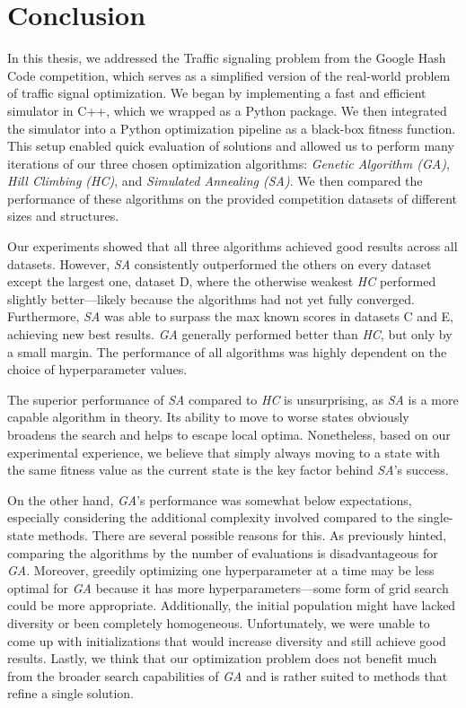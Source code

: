 \chapter*{Conclusion}

In this thesis, we addressed the Traffic signaling problem from the Google Hash Code competition, which serves as a simplified version of the real-world problem of traffic signal optimization. We began by implementing a fast and efficient simulator in C++, which we wrapped as a Python package. We then integrated the simulator into a Python optimization pipeline as a black-box fitness function. This setup enabled quick evaluation of solutions and allowed us to perform many iterations of our three chosen optimization algorithms: \textit{Genetic Algorithm (GA)}, \textit{Hill Climbing (HC)}, and \textit{Simulated Annealing (SA)}. We then compared the performance of these algorithms on the provided competition datasets of different sizes and structures.

Our experiments showed that all three algorithms achieved good results across all datasets. However, \textit{SA} consistently outperformed the others on every dataset except the largest one, dataset D, where the otherwise weakest \textit{HC} performed slightly better---likely because the algorithms had not yet fully converged. Furthermore, \textit{SA} was able to surpass the max known scores in datasets C and E, achieving new best results. \textit{GA} generally performed better than \textit{HC}, but only by a small margin.
The performance of all algorithms was highly dependent on the choice of hyperparameter values.

The superior performance of \textit{SA} compared to \textit{HC} is unsurprising, as \textit{SA} is a more capable algorithm in theory. Its ability to move to worse states obviously broadens the search and helps to escape local optima. Nonetheless, based on our experimental experience, we believe that simply always moving to a state with the same fitness value as the current state is the key factor behind \textit{SA}'s success.

On the other hand, \textit{GA}'s performance was somewhat below expectations, especially considering the additional complexity involved compared to the single-state methods. There are several possible reasons for this. As previously hinted, comparing the algorithms by the number of evaluations is disadvantageous for \textit{GA}. Moreover, greedily optimizing one hyperparameter at a time may be less optimal for \textit{GA} because it has more hyperparameters---some form of grid search could be more appropriate. Additionally, the initial population might have lacked diversity or been completely homogeneous. Unfortunately, we were unable to come up with initializations that would increase diversity and still achieve good results.
Lastly, we think that our optimization problem does not benefit much from the broader search capabilities of \textit{GA} and is rather suited to methods that refine a single solution.

